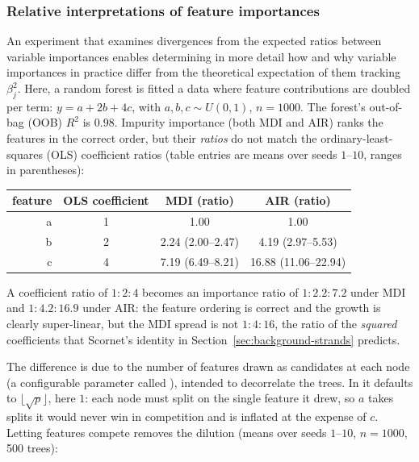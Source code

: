 \subsubsection{Relative interpretations of feature importances}
\label{sec:relativelinear}
An experiment that examines divergences from the expected ratios between 
variable importances enables determining in more detail how and why 
variable importances in practice differ from the theoretical expectation
of them tracking  $\beta_j^2$.
Here, 
a random forest is fitted a data where feature contributions are doubled per term: $y = a + 2b + 4c$, with
$a,b,c \sim U(0,1)$, $n = 1000$. The forest's out-of-bag (OOB) $R^2$ is $0.98$.
Impurity importance (both MDI and AIR) ranks the features in the correct
order, 
but their \emph{ratios} do not match the ordinary-least-squares (OLS)
coefficient ratios (table entries are means over seeds $1$--$10$, ranges in
parentheses):

\begin{center}
\begin{tabular}{rccc}
\toprule
feature & OLS coefficient & MDI (ratio) & AIR (ratio)
\\
\midrule
a & 1 & 1.00 & 1.00 \\
b & 2 & 2.24 (2.00--2.47) & 4.19 (2.97--5.53) \\
c & 4 & 7.19 (6.49--8.21) & 16.88 (11.06--22.94) \\
\bottomrule
\end{tabular}
\end{center}

A coefficient ratio of $1:2:4$ becomes an importance ratio of $1:2.2:7.2$ under
MDI and $1:4.2:16.9$ under AIR: the
feature ordering is correct and the growth is clearly super-linear, but the MDI spread is not
 $1:4:16$, the ratio of the \emph{squared} coefficients that Scornet's identity in 
Section~\ref{sec:background-strands} predicts. 


The difference 
is due to the number of features drawn as
candidates at each node (a configurable parameter called ), intended
to decorrelate the trees. In  it defaults
to $\lfloor \sqrt{p} \rfloor$, here $1$: each node must split on the
single feature it drew, so $a$ takes splits it would never win in competition
and
is inflated at the expense of $c$. Letting features compete removes the dilution
(means over seeds $1$--$10$, $n=1000$, 500 trees):

